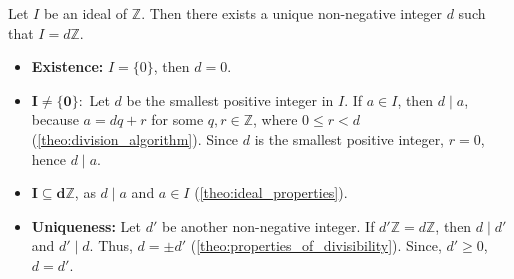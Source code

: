 \begin{theo}

    \label{theo:ideal_generator}

    Let \( I \) be an ideal of \( \mathbb{Z} \). Then there exists a unique non-negative integer \( d \) such that \( I = d\mathbb{Z} \).
\end{theo}

\begin{Proof}
    \begin{itemize}
        \item \textbf{Existence:} $I=\{0\}$, then $d = 0$.
        \item $\mathbf{I \neq \{0\}:}$ Let $d$ be the smallest positive integer in $I$. 
        If $a\in I$, then $d\mid a$, because  $a = dq + r$ for some $q,r\in\mathbb{Z}$, where $0\leq r < d$ (\ref{theo:division_algorithm}).
        Since $d$ is the smallest positive integer, $r = 0$, hence $d\mid a$.
        \item $\mathbf{I\subseteq d\mathbb{Z}}$, as $d\mid a$ and $a\in I$ (\ref{theo:ideal_properties}).
        \item \textbf{Uniqueness:} Let $d'$ be another non-negative integer. If $d'\mathbb{Z}=d\mathbb{Z}$,
        then $d\mid d'$ and $d'\mid d$. Thus, $d=\pm d'$ (\ref{theo:properties_of_divisibility}). Since, $d'\geq0$, $d=d'$.
    \end{itemize}
    

\end{Proof}



